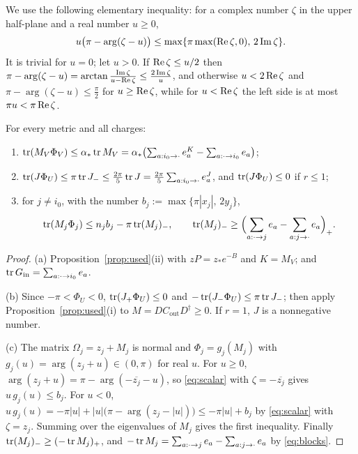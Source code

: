 We use the following elementary inequality: for a complex number $\zeta$ in
the upper half-plane and a real number $u\geq0$,
\begin{equation}\label{eq:scalar}
 u\bigl(\pi-\arg(\zeta-u)\bigr)\leq\max\{\pi\max(\operatorname{Re}\zeta,0),\,2\operatorname{Im}\zeta\}.
\end{equation}
It is trivial for $u=0$; let $u>0$. If $\operatorname{Re}\zeta\leq u/2$ then
$\pi-\arg(\zeta-u)=\arctan\frac{\operatorname{Im}\zeta}{u-\operatorname{Re}\zeta}\leq\frac{2\operatorname{Im}\zeta}u$,
and otherwise $u<2\operatorname{Re}\zeta$ and $\pi-\arg(\zeta-u)\leq\frac\pi2$ for
$u\geq\operatorname{Re}\zeta$, while for $u<\operatorname{Re}\zeta$ the left side is at most
$\pi u<\pi\operatorname{Re}\zeta$.

\begin{lemma}\label{lem:three}
For every metric and all charges:
\begin{enumerate}
\item[(a)] $\operatorname{tr}(M_V\Phi_V)\leq\alpha_\ast\operatorname{tr} M_V
 =\alpha_\ast\bigl(\sum_{a:i_0\to\cdot}e_a^K-\sum_{a:\cdot\to i_0}e_a\bigr)$;
\item[(b)] $\operatorname{tr}(J\Phi_U)\leq\pi\operatorname{tr} J_-\leq\frac{2\pi}5\operatorname{tr} J
 =\frac{2\pi}5\sum_{a:i_0\to\cdot}e_a^J$, and $\operatorname{tr}(J\Phi_U)\leq0$ if $r\leq1$;
\item[(c)] for $j\neq i_0$, with the number $b_j:=\max\{\pi|x_j|,\,2y_j\}$,
 \[
 \operatorname{tr}(M_j\Phi_j)\leq n_jb_j-\pi\operatorname{tr}(M_j)_-,\qquad
 \operatorname{tr}(M_j)_-\geq\Bigl(\sum_{a:\cdot\to j}e_a-\sum_{a:j\to\cdot}e_a\Bigr)_+ .
 \]
\end{enumerate}
\end{lemma}

\begin{proof}
(a) Proposition~\ref{prop:used}(ii) with $zP=z_\ast e^{-B}$ and $K=M_V$; and
$\operatorname{tr} G_{\mathrm{in}}=\sum_{a:\cdot\to i_0}e_a$.

(b) Since $-\pi<\Phi_U<0$, $\operatorname{tr}(J_+\Phi_U)\leq0$ and
$-\operatorname{tr}(J_-\Phi_U)\leq\pi\operatorname{tr} J_-$; then apply
Proposition~\ref{prop:used}(i) to $M=DC_{\mathrm{out}}D^\dagger\geq0$. If
$r=1$, $J$ is a nonnegative number.

(c) The matrix $\Omega_j=z_j+M_j$ is normal and $\Phi_j=g_j(M_j)$ with
$g_j(u)=\arg(z_j+u)\in(0,\pi)$ for real $u$. For $u\geq0$,
$\arg(z_j+u)=\pi-\arg(-\overline{z_j}-u)$, so \eqref{eq:scalar} with
$\zeta=-\overline{z_j}$ gives $u\,g_j(u)\leq b_j$. For $u<0$,
$u\,g_j(u)=-\pi|u|+|u|\bigl(\pi-\arg(z_j-|u|)\bigr)\leq-\pi|u|+b_j$ by
\eqref{eq:scalar} with $\zeta=z_j$. Summing over the eigenvalues of $M_j$ gives
the first inequality. Finally $\operatorname{tr}(M_j)_-\geq(-\operatorname{tr} M_j)_+$, and
$-\operatorname{tr} M_j=\sum_{a:\cdot\to j}e_a-\sum_{a:j\to\cdot}e_a$ by \eqref{eq:blocks}.
\end{proof}

